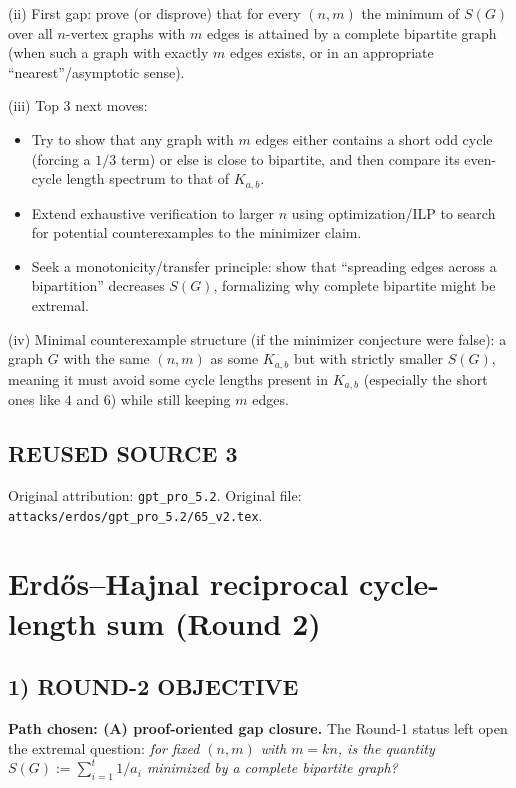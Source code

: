 (ii) First gap: prove (or disprove) that for every $(n,m)$ the minimum of $S(G)$ over all $n$-vertex graphs with $m$ edges 
is attained by a complete bipartite graph (when such a graph with exactly $m$ edges exists, or in an appropriate 
``nearest''/asymptotic sense).

(iii) Top 3 next moves:
\begin{itemize}
\item Try to show that any graph with $m$ edges either contains a short odd cycle (forcing a $1/3$ term) or else is close 
to bipartite, and then compare its even-cycle length spectrum to that of $K_{a,b}$.
\item Extend exhaustive verification to larger $n$ using optimization/ILP to search for potential counterexamples to the 
minimizer claim.
\item Seek a monotonicity/transfer principle: show that ``spreading edges across a bipartition'' decreases $S(G)$, formalizing 
why complete bipartite might be extremal.
\end{itemize}

(iv) Minimal counterexample structure (if the minimizer conjecture were false): a graph $G$ with the same $(n,m)$ as some 
$K_{a,b}$ but with strictly smaller $S(G)$, meaning it must avoid some cycle lengths present in $K_{a,b}$ (especially the 
short ones like $4$ and $6$) while still keeping $m$ edges.



\subsection*{REUSED SOURCE 3}
Original attribution: \texttt{gpt\_pro\_5.2}.
Original file: \texttt{attacks/erdos/gpt\_pro\_5.2/65\_v2.tex}.

\section{Erd\H{o}s--Hajnal reciprocal cycle-length sum (Round 2)}

\subsection*{1) \textbf{ROUND-2 OBJECTIVE}}
\textbf{Path chosen: (A) proof-oriented gap closure.}
The Round-1 status left open the extremal question:
\emph{for fixed $(n,m)$ with $m=kn$, is the quantity $S(G):=\sum_{i=1}^t 1/a_i$ minimized by a complete bipartite graph?}

